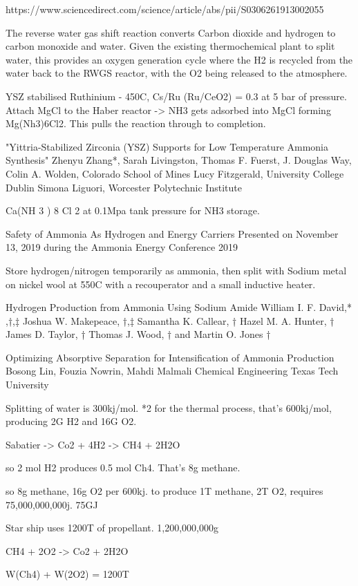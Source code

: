 \documentclass[10pt]{article}
\begin{document}
https://www.sciencedirect.com/science/article/abs/pii/S0306261913002055

The reverse water gas shift reaction converts Carbon dioxide and hydrogen to carbon monoxide and water. Given the existing thermochemical plant to split water, this provides an oxygen generation cycle where the H2 is recycled from the water back to the RWGS reactor, with the O2 being released to the atmosphere.


YSZ stabilised Ruthinium - 450C, Cs/Ru (Ru/CeO2) = 0.3 at 5 bar of pressure. Attach MgCl to the Haber reactor -> NH3 gets adsorbed into MgCl forming Mg(Nh3)6Cl2. This pulls the reaction through to completion.

"Yittria-Stabilized Zirconia (YSZ) Supports for Low Temperature Ammonia Synthesis"  Zhenyu Zhang*, Sarah Livingston, Thomas F. Fuerst, J. Douglas Way, Colin A. Wolden, Colorado School of Mines
Lucy Fitzgerald, University College Dublin
Simona Liguori, Worcester Polytechnic Institute

Ca(NH 3 ) 8 Cl 2 at 0.1Mpa tank pressure for NH3 storage.

Safety of Ammonia As Hydrogen and Energy Carriers
Presented on November 13, 2019 during the Ammonia Energy Conference 2019 

Store hydrogen/nitrogen temporarily as ammonia, then split with Sodium metal on nickel wool at 550C with a recouperator and a small inductive heater.

Hydrogen Production from Ammonia Using Sodium Amide
William I. F. David,* ,†,‡ Joshua W. Makepeace, †,‡ Samantha K. Callear, † Hazel M. A. Hunter, †
James D. Taylor, † Thomas J. Wood, † and Martin O. Jones †


Optimizing Absorptive Separation for
Intensification of Ammonia Production
Bosong Lin, Fouzia Nowrin, Mahdi Malmali
Chemical Engineering
Texas Tech University

Splitting of water is 300kj/mol. *2 for the thermal process, that's 600kj/mol, producing 2G H2 and 16G O2. 

Sabatier -> Co2 + 4H2 -> CH4 + 2H2O

so 2 mol H2 produces 0.5 mol Ch4. That's 8g methane.

so 8g methane, 16g O2 per 600kj. 
to produce 1T methane, 2T O2, requires 75,000,000,000j.  75GJ

Star ship uses 1200T of propellant. 1,200,000,000g

CH4 + 2O2 -> Co2 + 2H2O

W(Ch4) + W(2O2) = 1200T
\end{document}
